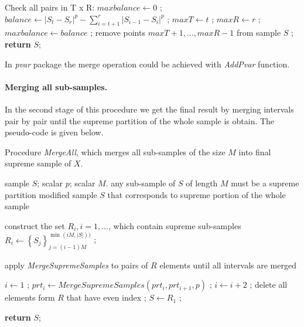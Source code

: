\documentclass[12pt, a4paper]{article}
\def\lc{\left\lceil}
\def\rc{\right\rceil}
\numberwithin{equation}{section}
\begin{document}
\begin{algorithm}[H]                     
\begin{algorithmic} [1]                

\item[] \Comment Check all pairs in T x R:
\State $maxbalance \leftarrow 0$ ; 
    \State $balance \leftarrow |S_t - S_r|^p - \sum_{i=t+1}^r |S_{i-1}-S_i|^p$ ;
        \State $maxT \leftarrow t$ ;
      	\State $maxR \leftarrow r$ ;
        \State $maxbalance \leftarrow balance$ ;
      \EndIf
  \EndFor      
\EndFor
{}
  \State remove points $maxT+1, \dots, maxR-1$ from sample $S$ ;
\EndIf
\State \textbf{return} $S$;
\EndFunction
\end{algorithmic}
\end{algorithm}

In \emph{pvar} package the merge
operation could be achieved 
with \emph{AddPvar} function.

\paragraph{Merging all sub-samples.}
In the second stage of this procedure we get 
the final result by
merging intervals pair by pair 
until the supreme partition of the whole sample 
is obtain.
The pseudo-code is given below.
\begin{algorithm}[H]
\caption{Procedure \emph{MergeAll}, which merges all
sub-samples of the size $M$ into final supreme sample of $X$.}
\label{alg:MergeAll}
\begin{algorithmic}[1]
\Input sample $S$;  scalar $p$; scalar $M$.
\Require any sub-sample of $S$ of length $M$ must be a supreme partition
\Output modified sample $S$ that corresponds to supreme portion of the whole sample

\item[]\Comment construct the set $R_i, i=1,\dots$, which contain supreme sub-samples 
\For{$i \leftarrow 1$ \textbf{ to } $\lc \frac{|S|}{M}\rc$}
  \State $R_i \leftarrow 
    \left\{ S_j \right\}_{j=(i-1)M}^{\min(iM, |S|))}$ ;
\EndFor
\item[]
\item[] \Comment apply \emph{MergeSupremeSamples} 
to pairs of $R$ elements until 
all intervals are merged

\State $i \leftarrow 1$ ;
    \State $prt_i \leftarrow MergeSupremeSamples(prt_i, prt_{i+1}, p) $ ;
    \State $i \leftarrow i+2$ ;  
  \EndWhile
  \State delete all elements form $R$ that have even index ;
\EndWhile
\State $S \leftarrow R_1 $ ;

\State \textbf{return} $S$;
\EndFunction
\end{algorithmic}
\end{algorithm}
\end{document}
